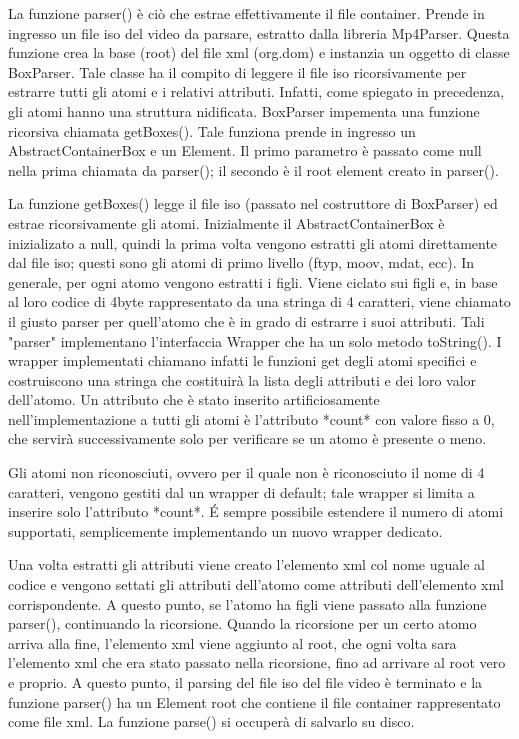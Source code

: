  La funzione parser() è ciò che estrae effettivamente il file container. Prende in ingresso un file iso del video da parsare, estratto dalla libreria Mp4Parser. Questa funzione crea la base (root) del file xml (org.dom) e instanzia un oggetto di classe BoxParser. Tale classe ha il compito di leggere il file iso ricorsivamente per estrarre tutti gli atomi e i relativi attributi. Infatti, come spiegato in precedenza, gli atomi hanno una struttura nidificata. BoxParser impementa una funzione ricorsiva chiamata getBoxes(). Tale funziona prende in ingresso un AbstractContainerBox e un Element. Il primo parametro è passato come null nella prima chiamata da parser(); il secondo è il root element creato in parser().

 La funzione getBoxes() legge il file iso (passato nel costruttore di BoxParser) ed estrae ricorsivamente gli atomi. Inizialmente il AbstractContainerBox è inizializato a null, quindi la prima volta vengono estratti gli atomi direttamente dal file iso; questi sono gli atomi di primo livello (ftyp, moov, mdat, ecc). In generale, per ogni atomo vengono estratti i figli. Viene ciclato sui figli e, in base al loro codice di 4byte rappresentato da una stringa di 4 caratteri, viene chiamato il giusto parser per quell'atomo che è in grado di estrarre i suoi attributi. Tali "parser" implementano l'interfaccia Wrapper che ha un solo metodo toString(). I wrapper implementati chiamano infatti le funzioni get degli atomi specifici e costruiscono una stringa che costituirà la lista degli attributi e dei loro valor dell'atomo. Un attributo che è stato inserito artificiosamente nell'implementazione a tutti gli atomi è l'attributo *count* con valore fisso a 0, che servirà successivamente solo per verificare se un atomo è presente o meno.

 Gli atomi non riconosciuti, ovvero per il quale non è riconosciuto il nome di 4 caratteri, vengono gestiti dal un wrapper di default; tale wrapper si limita a inserire solo l'attributo *count*. É sempre possibile estendere il numero di atomi supportati, semplicemente implementando un nuovo wrapper dedicato.

 Una volta estratti gli attributi viene creato l'elemento xml col nome uguale al codice e vengono settati gli attributi dell'atomo come attributi dell'elemento xml corrispondente. A questo punto, se l'atomo ha figli viene passato alla funzione parser(), continuando la ricorsione. Quando la ricorsione per un certo atomo arriva alla fine, l'elemento xml viene aggiunto al root, che ogni volta sara l'elemento xml che era stato passato nella ricorsione, fino ad arrivare al root vero e proprio. A questo punto, il parsing del file iso del file video è terminato e la funzione parser() ha un Element root che contiene il file container rappresentato come file xml. La funzione parse() si occuperà di salvarlo su disco.

